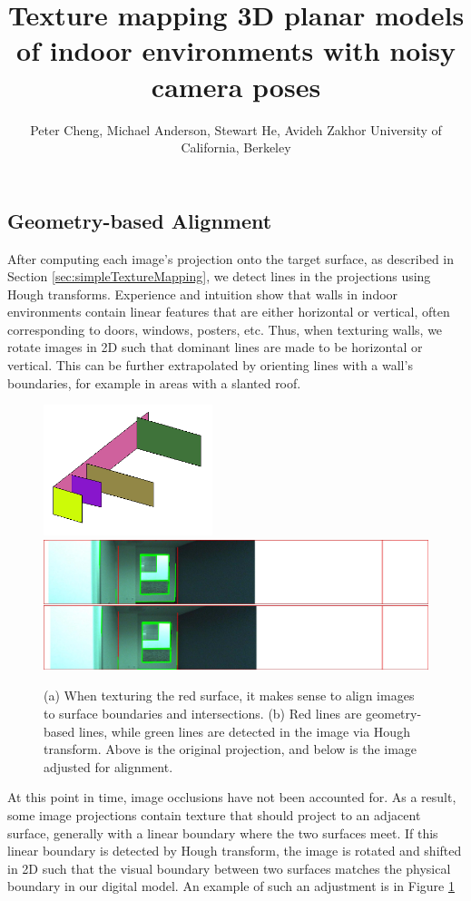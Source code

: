 \documentclass[]{spie}  %
\title{Texture mapping 3D planar models of indoor environments with noisy camera poses}
\author{Peter Cheng, Michael Anderson, Stewart He, Avideh Zakhor
\skiplinehalf
University of California, Berkeley\\
}
\begin{document}
\subsection{Geometry-based Alignment}
\label{sec:geometryAlignment}
After computing each image's projection onto the target surface, as
described in Section \ref{sec:simpleTextureMapping}, we detect lines
in the projections using Hough transforms. Experience and intuition
show that walls in indoor environments contain linear features that
are either horizontal or vertical, often corresponding to doors,
windows, posters, etc. Thus, when texturing walls, we rotate images in
2D such that dominant lines are made to be horizontal or
vertical. This can be further extrapolated by orienting lines with a
wall's boundaries, for example in areas with a slanted roof.

\begin{figure}
  \centering
  \includegraphics[height=1.5in]{geometryAlign_planes.png}
  \includegraphics[height=1.5in]{geometryAlignment.jpg}
  \caption{(a) When texturing the red surface, it makes sense to align images to surface boundaries and intersections. (b) Red lines are geometry-based lines, while green lines are detected in the image via Hough transform. Above is the original projection, and below is the image adjusted for alignment.}
  \label{fig:geometryAlignment}
\end{figure}


At this point in time, image occlusions have not been accounted
for. As a result, some image projections contain texture that should
project to an adjacent surface, generally with a linear boundary where
the two surfaces meet. If this linear boundary is detected by Hough
transform, the image is rotated and shifted in 2D such that the visual
boundary between two surfaces matches the physical boundary in our
digital model. An example of such an adjustment is in Figure
\ref{fig:geometryAlignment}
\end{document}
